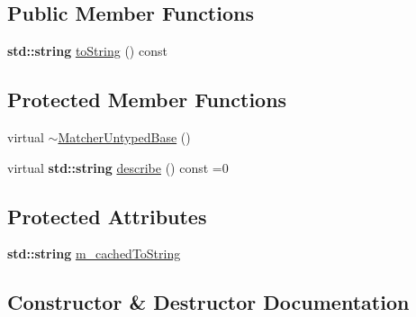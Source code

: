 \subsection*{Public Member Functions}
\begin{DoxyCompactItemize}
\item 
\textbf{ std\+::string} \hyperlink{class_catch_1_1_matchers_1_1_impl_1_1_matcher_untyped_base_a5982c7c80ca71dfe2298babadad7a453}{to\+String} () const
\end{DoxyCompactItemize}
\subsection*{Protected Member Functions}
\begin{DoxyCompactItemize}
\item 
virtual \hyperlink{class_catch_1_1_matchers_1_1_impl_1_1_matcher_untyped_base_a853be93ce33f71b5abede38081c79e9d}{$\sim$\+Matcher\+Untyped\+Base} ()
\item 
virtual \textbf{ std\+::string} \hyperlink{class_catch_1_1_matchers_1_1_impl_1_1_matcher_untyped_base_a91d3a907dbfcbb596077df24f6e11fe2}{describe} () const =0
\end{DoxyCompactItemize}
\subsection*{Protected Attributes}
\begin{DoxyCompactItemize}
\item 
\textbf{ std\+::string} \hyperlink{class_catch_1_1_matchers_1_1_impl_1_1_matcher_untyped_base_a951095c462657e7097a9a6dc4dde813f}{m\+\_\+cached\+To\+String}
\end{DoxyCompactItemize}


\subsection{Constructor \& Destructor Documentation}
\mbox{\label{class_catch_1_1_matchers_1_1_impl_1_1_matcher_untyped_base_a853be93ce33f71b5abede38081c79e9d}} 

